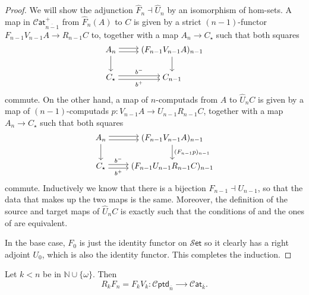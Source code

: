 \documentclass[12pt,a4paper]{article}
\numberwithin{equation}{section}
\newcommand{\cat}[1]{\mathscr{C} \mathsf{at}_{\overline{#1}}}
\newcommand{\cptd}[1]{\mathscr{C} \mathsf{ptd}_{\overline{#1}}}
\newcommand{\set}{\mathscr{S} \mathsf{et}}
\begin{document}
\begin{proof}
    We will show the adjunction $\hat{F}_n \dashv \hat{U}_n$ by an isomorphism of hom-sets. A map in $\cat{n-1}^+$ from $\hat{F}_n (A)$ to $C$ is given by a strict $(n-1)$-functor $F_{n-1} V_{n-1} A \to R_{n-1} C$ to, together with a map $A_n \to C_\star$ such that both squares
    \begin{equation}\label{eq:cptd_catplus_cond_on_left}
        \begin{tikzcd}[cramped]
            A_n \arrow[r, shift left=0.5ex] \arrow[r, shift right=0.5ex] \arrow[d] & (F_{n-1}V_{n-1} A)_{n-1} \arrow[d] \\
            C_\star \arrow[r, shift left=0.5ex, "b^-"] \arrow[r, shift right=0.5ex, "b^+"'] & C_{n-1}
        \end{tikzcd}
    \end{equation}
    commute. On the other hand, a map of $n$-computads from $A$ to $\hat{U}_n C$ is given by a map of $(n-1)$-computads $p: V_{n-1} A \to U_{n-1} R_{n-1} C$, together with a map $A_n \to C_\star$ such that both squares
    \begin{equation}\label{eq:cptd_catplus_cond_on_right}
        \begin{tikzcd}[cramped]
            A_n \arrow[r, shift left=0.5ex] \arrow[r, shift right=0.5ex] \arrow[d] & (F_{n-1}V_{n-1} A)_{n-1} \arrow[d, "(F_{n-1}p)_{n-1}"] \\
            C_\star \arrow[r, shift left=0.5ex, "b^-"] \arrow[r, shift right=0.5ex, "b^+"'] & (F_{n-1} U_{n-1} R_{n-1} C)_{n-1}
        \end{tikzcd}
    \end{equation}
    commute. Inductively we know that there is a bijection $F_{n-1} \dashv U_{n-1}$, so that the data that makes up the two maps is the same. Moreover, the definition of the source and target maps of $\hat{U}_n C$ is exactly such that the conditions of  and the ones of  are equivalent. 

    In the base case, $F_0$ is just the identity functor on $\set$ so it clearly has a right adjoint $U_0$, which is also the identity functor. This completes the induction.
\end{proof}


\begin{lemma}\label{lem:free_cat_same_below}
    Let $k < n$ be in $\mathbb{N} \cup \{ \omega \}$. Then
    \begin{equation}
        R_k F_n = F_k V_k : \cptd{n} \xrightarrow{\qquad} \cat{k}.
    \end{equation}
\end{lemma}
\end{document}
